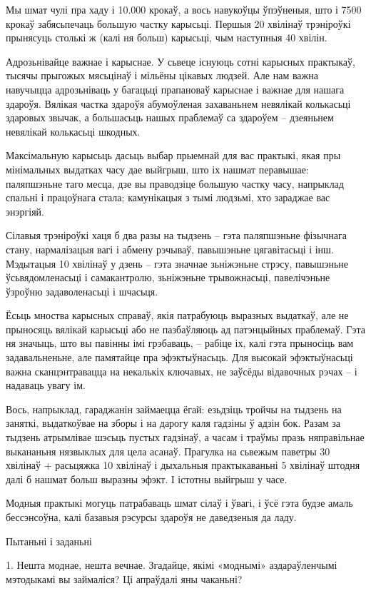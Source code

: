 Мы шмат чулі пра хаду і 10.000 крокаў, а вось навукоўцы ўпэўненыя, што і 7500 крокаў забясьпечаць большую частку карысьці. Першыя 20 хвілінаў трэніроўкі прынясуць столькі ж (калі ня больш) карысьці, чым наступныя 40 хвілін.

Адрозьнівайце важнае і карыснае. У сьвеце існуюць сотні карысных практыкаў, тысячы прыгожых мясьцінаў і мільёны цікавых людзей. Але нам важна навучыцца адрозьніваць у багацьці прапановаў карыснае і важнае для нашага здароўя. Вялікая частка здароўя абумоўленая захаваньнем невялікай колькасьці здаровых звычак, а большасьць нашых праблемаў са здароўем – дзеяньнем невялікай колькасьці шкодных.

Максімальную карысьць дасьць выбар прыемнай для вас практыкі, якая пры мінімальных выдатках часу дае выйгрыш, што іх нашмат перавышае: паляпшэньне таго месца, дзе вы праводзіце большую частку часу, напрыклад спальні і працоўнага стала; камунікацыя з тымі людзьмі, хто зараджае вас энэргіяй.

Сілавыя трэніроўкі хаця б два разы на тыдзень – гэта паляпшэньне фізычнага стану, нармалізацыя вагі і абмену рэчываў, павышэньне цягавітасьці і інш. Мэдытацыя 10 хвілінаў у дзень – гэта значнае зьніжэньне стрэсу, павышэньне ўсьвядомленасьці і самакантролю, зьніжэньне трывожнасьці, павелічэньне ўзроўню задаволенасьці і шчасьця.

Ёсьць мноства карысных справаў, якія патрабуюць выразных выдаткаў, але не прыносяць вялікай карысьці або не пазбаўляюць ад патэнцыйных праблемаў. Гэта ня значыць, што вы павінны імі грэбаваць, – рабіце іх, калі гэта прыносіць вам задавальненьне, але памятайце пра эфэктыўнасьць. Для высокай эфэктыўнасьці важна сканцэнтравацца на некалькіх ключавых, не заўсёды відавочных рэчах – і надаваць увагу ім.

Вось, напрыклад, гараджанін займаецца ёгай: езьдзіць тройчы на тыдзень на заняткі, выдаткоўвае на зборы і на дарогу каля гадзіны ў адзін бок. Разам за тыдзень атрымлівае шэсьць пустых гадзінаў, а часам і траўмы празь няправільнае выкананьня нязвыклых для цела асанаў. Прагулка на сьвежым паветры 30 хвілінаў + расьцяжка 10 хвілінаў і дыхальныя практыкаваньні 5 хвілінаў штодня далі б нашмат больш выразны эфэкт. І істотны выйгрыш у часе.

Модныя практыкі могуць патрабаваць шмат сілаў і ўвагі, і ўсё гэта будзе амаль бессэнсоўна, калі базавыя рэсурсы здароўя не даведзеныя да ладу.

Пытаньні і заданьні

1. Нешта моднае, нешта вечнае. Згадайце, якімі «моднымі» аздараўленчымі мэтодыкамі вы займаліся? Ці апраўдалі яны чаканьні?

